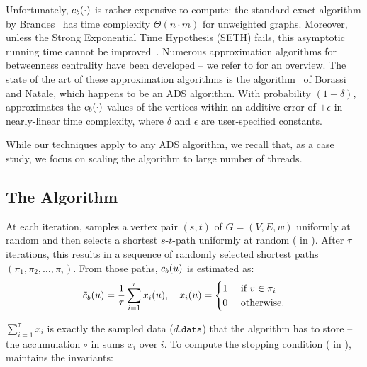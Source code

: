 Unfortunately, $c_b(\cdot)$ is rather expensive to compute: the standard exact
algorithm by Brandes~\cite{brandes2001faster} has time complexity $\Theta(n\cdot m)$
for unweighted graphs. Moreover, unless the Strong Exponential Time Hypothesis (SETH)
fails, this asymptotic running time cannot be improved~\cite{DBLP:journals/entcs/BorassiCH16}.
Numerous approximation algorithms for betweenness centrality have been developed --
we refer to  for an overview.
The state of the art of these approximation algorithms is the \kadabra
algorithm~\cite{DBLP:conf/esa/BorassiN16} of Borassi and Natale, which happens to
be an ADS algorithm.
%
With probability $(1 - \delta)$, \kadabra approximates the $c_b(\cdot)$ values
of the vertices within an additive error of $\pm\epsilon$ in nearly-linear
time complexity, where $\delta$ and $\epsilon$ are user-specified constants.

While our techniques apply to any ADS algorithm, we recall that, as a case
study, we focus on scaling the \kadabra algorithm to large number of threads.

\subsection{The \kadabra Algorithm}
\label{sec:betw-apx:kad-algo}
%
At each iteration, \kadabra samples a vertex pair $(s, t)$ of $G = (V, E,
w)$ uniformly at random and then selects a shortest $s$-$t$-path
uniformly at random ( in ).
After $\tau$ iterations, this results in a sequence of randomly selected
shortest paths $(\pi_1, \pi_2, \ldots, \pi_\tau)$. From those paths,
$c_b(u)$ is estimated as:
%
\[
    \tilde{c}_b(u) = \frac 1\tau\sum_{i = 1}^\tau x_i(u),\quad x_i(u) =
    \begin{cases}
        1 & \text{ if } v \in \pi_i\\
        0 & \text{ otherwise}.
    \end{cases}
\]

$\sum_{i = 1}^\tau x_i$ is exactly the sampled data ($d\mathtt{.data}$)
that the algorithm has to store -- the accumulation $\circ$ in
 sums $x_i$ over $i$.
To compute the stopping condition ( in
), \kadabra maintains the
invariants:

